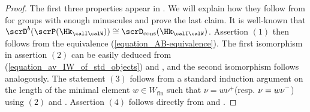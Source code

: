 \documentclass[10pt, reqno]{amsart}
\theoremstyle{plain}
\theoremstyle{definition}
\newcommand{\minus}{\scalebox{0.75}[1.0]{$-$}}
\numberwithin{equation}{section}
\begin{document}
\begin{proof}
	The first three properties appear in \cite[Corollary 7.1.6, Lemmas 7.2.1 and 7.2.2]{AR}. We will explain how they follow from  for groups with enough minuscules and prove the last claim. It is well-known that $\scrD^b(\scrP(\Hk_{\calI\calW}))\cong \scrD_{\mathrm{cons}}(\Hk_{\calI\calW})$. Assertion  $(1)$ then follows from the equivalence (\ref{equation_AB-equivalence}).   The first isomorphism in assertion $(2)$ can be easily deduced from (\ref{equation_av_IW_of_std_objects}) and , and the second isomorphism follows analogously. The statement $(3)$ follows from a standard induction argument on the length of the minimal element
	$w \in W_\mathrm{fin}$ such that $\nu=w\nu^+$(resp. $\nu=w\nu^{\minus}$) using $(2)$ and \cite[Proposition 7.1.4]{AR}.
	Assertion $(4)$ follows directly from  and .
\end{proof}
\end{document}
